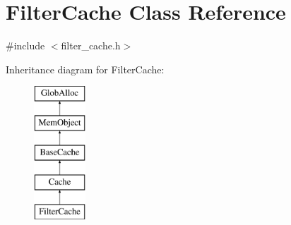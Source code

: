 \hypertarget{classFilterCache}{\section{Filter\-Cache Class Reference}
\label{classFilterCache}
}


{\ttfamily \#include $<$filter\-\_\-cache.\-h$>$}

Inheritance diagram for Filter\-Cache\-:\begin{figure}[H]
\begin{center}
\leavevmode
\includegraphics[height=5.000000cm]{classFilterCache}
\end{center}
\end{figure}
